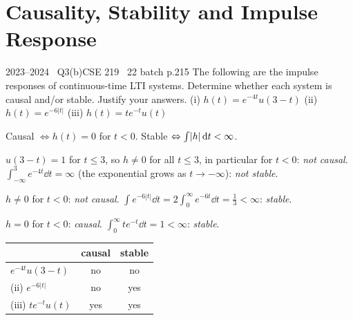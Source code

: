 \renewcommand{\teacherTag}{ANIK SIR \textbullet\ LECTURE 4}
\chapter{Causality, Stability and Impulse Response}

\begin{qcard}{2023--2024 \textbullet\ Q3(b)}{CSE 219 \textbullet\ 22 batch p.2}{15}
The following are the impulse responses of continuous-time LTI systems. Determine whether each system is causal and/or stable. Justify your answers.
(i) $h(t)=e^{-4t}u(3-t)$ \quad (ii) $h(t)=e^{-6|t|}$ \quad (iii) $h(t)=te^{-t}u(t)$
\end{qcard}
\begin{solution}
Causal $\Leftrightarrow h(t)=0$ for $t<0$. Stable $\Leftrightarrow\int\lvert h\rvert\,\mathrm{d} t<\infty$.
\begin{steps}
\item $u(3-t)=1$ for $t\le3$, so $h\ne0$ for all $t\le3$, in particular for $t<0$: \emph{not causal}. $\int_{-\infty}^{3}e^{-4t}\dd t=\infty$ (the exponential grows as $t\to-\infty$): \emph{not stable}.
\item $h\ne0$ for $t<0$: \emph{not causal}. $\int e^{-6|t|}\dd t=2\int_0^\infty e^{-6t}\dd t=\frac13<\infty$: \emph{stable}.
\item $h=0$ for $t<0$: \emph{causal}. $\int_0^\infty te^{-t}\dd t=1<\infty$: \emph{stable}.
\end{steps}
\begin{center}\small\begin{tabular}{@{}lcc@{}}\toprule & causal & stable\\\midrule (i) $e^{-4t}u(3-t)$ & no & no\\ (ii) $e^{-6|t|}$ & no & yes\\ (iii) $te^{-t}u(t)$ & yes & yes\\\bottomrule\end{tabular}\end{center}
\end{solution}


